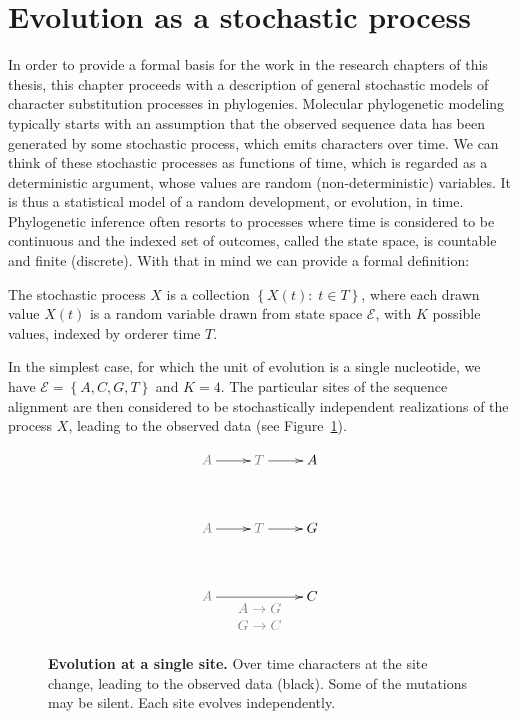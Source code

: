 \section{Evolution as a stochastic process}

In order to provide a formal basis for the work in the research chapters of this thesis, this chapter proceeds with a description of general stochastic models of character substitution processes in phylogenies. 
Molecular phylogenetic modeling typically starts with an assumption that the observed sequence data has been generated by some stochastic process, which emits characters over time.
We can think of these stochastic processes as functions of time, which is regarded as a deterministic argument, whose values are random (non-deterministic) variables. 
It is thus a statistical model of a random development, or evolution, in time.
Phylogenetic inference often resorts to processes where time is considered to be continuous and the indexed set of outcomes, called the state space, is countable and finite (discrete).
With that in mind we can provide a formal definition:

\begin{definition} 
The stochastic process $X$ is a collection $\left\{ X(t):\; t\in T\right\} $, where each drawn value $X(t)$ is a random variable drawn from state space $\mathcal{E}$, with $K$ possible values, indexed by orderer time $T$.
\label{def:stochasticProc}
\end{definition} 

In the simplest case, for which the unit of evolution is a single nucleotide, we have $\mathcal{E}=\left\{ A,C,G,T\right\}$ and $K=4$.
The particular sites of the sequence alignment are then considered to be stochastically independent realizations of the process $X$, leading to the observed data (see Figure~\ref{fig:alignment}). 

\begin{figure}[H]
\centering
\begingroup
\everymath{\displaystyle}
{\Large
\begin{displaymath} %
    \xymatrix@R+1pc{ 
\color{gray2}A \ar[r] & \color{gray2}T \ar[r] & A \\
\color{gray2}A \ar[r] & \color{gray2}T \ar[r] & G \\
\color{gray2}A  \ar[rr]_{ \color{gray2}\begin{array}{c}
A\rightarrow G\\
G\rightarrow C
\end{array}} &&  C
    } %
\end{displaymath}
}%
\endgroup
\caption{
{ \footnotesize 
{\bf Evolution at a single site.} Over time characters at the site change, leading to the observed data (black). Some of the mutations may be silent. Each site evolves independently.
}%
}
\label{fig:alignment}
\end{figure}

